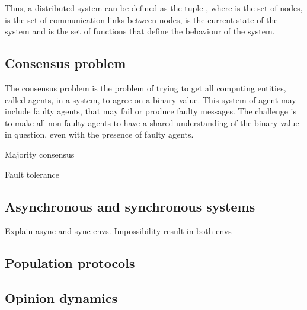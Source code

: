 Thus, a distributed system can be defined as the tuple , where  is the set of nodes,  is the set of communication links between nodes,  is the current state of the system and  is the set of functions that define the behaviour of the system.

\subsection{Consensus problem}


The consensus problem is the problem of trying to get  all computing entities, called agents, in a system, to agree on a binary value. This system of agent may include faulty agents, that may fail or produce faulty messages. The challenge is to make all non-faulty agents to have a shared understanding of the binary value in question, even with the presence of faulty agents. 

Majority consensus

Fault tolerance

\subsection{Asynchronous and synchronous systems}

Explain async and sync envs. Impossibility result in both envs

\subsection{Population protocols}



\subsection{Opinion dynamics}


